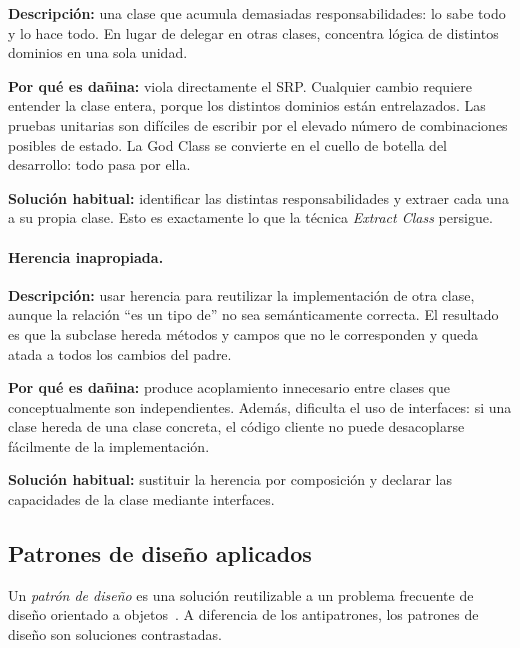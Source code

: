 \documentclass[11pt,a4paper]{article}
\begin{document}
\textbf{Descripción:} una clase que acumula demasiadas responsabilidades:
lo sabe todo y lo hace todo.  En lugar de delegar en otras clases,
concentra lógica de distintos dominios en una sola unidad.

\textbf{Por qué es dañina:} viola directamente el SRP.  Cualquier cambio
requiere entender la clase entera, porque los distintos dominios están
entrelazados.  Las pruebas unitarias son difíciles de escribir por el
elevado número de combinaciones posibles de estado.  La God Class se
convierte en el cuello de botella del desarrollo: todo pasa por ella.

\textbf{Solución habitual:} identificar las distintas responsabilidades
y extraer cada una a su propia clase.  Esto es exactamente lo que la
técnica \emph{Extract Class} persigue.

\label{sec:fund-inh-misuse}
\paragraph{Herencia inapropiada.}

\textbf{Descripción:} usar herencia para reutilizar la implementación
de otra clase, aunque la relación ``es un tipo de'' no sea semánticamente
correcta.  El resultado es que la subclase hereda métodos y campos que
no le corresponden y queda atada a todos los cambios del padre.

\textbf{Por qué es dañina:} produce acoplamiento innecesario entre clases
que conceptualmente son independientes.  Además, dificulta el uso de
interfaces: si una clase hereda de una clase concreta, el código cliente
no puede desacoplarse fácilmente de la implementación.

\textbf{Solución habitual:} sustituir la herencia por composición y
declarar las capacidades de la clase mediante interfaces.

\subsection{Patrones de diseño aplicados}
\label{sec:fund-patrones}

Un \emph{patrón de diseño} es una solución reutilizable a un problema
frecuente de diseño orientado a objetos~\cite{gamma1995}.  A diferencia
de los antipatrones, los patrones de diseño son soluciones contrastadas.

\label{sec:fund-extract-class}
\end{document}
